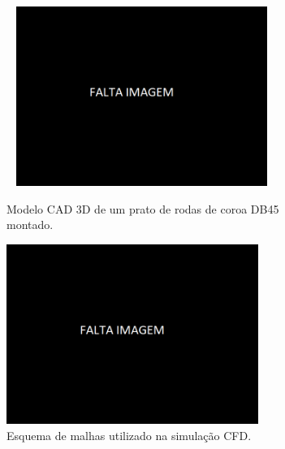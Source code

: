 \begin{figure}[htb]
    \centering
    \begin{subfigure}{.5\textwidth}\
        \centering
        \includegraphics[width = 0.9\textwidth]{Figures/Cap3/Falta_Imagem.png}
        \caption[Modelo 3D de um prato montado]%
        {Modelo CAD 3D de um prato de rodas de coroa DB45 montado.}
        \label{fig:modelo_montado}
    \end{subfigure}%
    \begin{subfigure}{.5\textwidth}
        \centering
        \includegraphics[width = 0.9\textwidth]{Figures/Cap3/Falta_Imagem.png}
        \caption[Esquema de malhas utilizado na simulação CFD.]%
        {Esquema de malhas utilizado na simulação CFD.}
        \label{fig:malha_simulacao}
    \end{subfigure}
    \caption{}
\end{figure}
